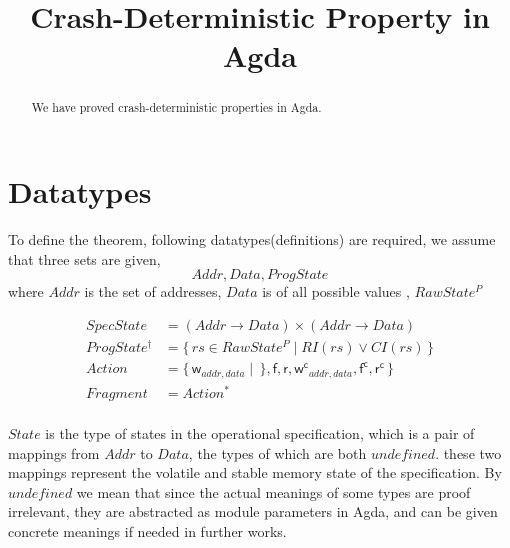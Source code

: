 \documentclass[a4paper,11pt]{article}
\theoremstyle{definition}
\begin{document}
\title{Crash-Deterministic Property in Agda}
\maketitle

\begin{abstract}
	We have proved crash-deterministic properties in Agda.
\end{abstract}


\section{Datatypes}

To define the theorem, following datatypes(definitions) are required,
we assume that three sets are given,  
$$\mathit{Addr}, \mathit{Data}, \mathit{ProgState}$$
where $\mathit{Addr}$ is the set of addresses, $\mathit{Data}$ is of all possible values , $\mathit{RawState^P}$

\begin{align*}
	\mathit{SpecState} &= (Addr \to Data) \times (Addr \to Data)\\
	\mathit{ProgState^{\dagger}} &= \{\, \mathit{rs} \in \mathit{RawState^P} \mid \mathit{RI(rs) \lor CI(rs)} \,\}\\
	\mathit{Action} &= \{\,\mathsf w_{addr, data} \mid \,\}, \mathsf f,\mathsf r,\mathsf {w^c}_{addr, data},\mathsf {f^c},\mathsf {r^c}\,\}\\
	\mathit{Fragment} &= \mathit{Action^*}\\
\end{align*}

$\mathit{State}$ is the type of states in the operational specification, which is a pair of mappings from $Addr$ to $Data$, the types of which are both $\mathit{undefined}$. these two mappings represent the volatile and stable memory state of the specification.  By $\mathit{undefined}$ we mean that since the actual meanings of some types are proof irrelevant, they are abstracted as module parameters in Agda, and can be given concrete meanings if needed in further works.
\end{document}
